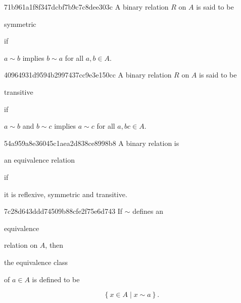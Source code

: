 \begin{note}{71b961a1f8f347dcbf7b9c7c8dee303c}
    A binary relation \({ R }\) on \({ A }\) is said to be \begin{icloze}{2}symmetric\end{icloze} if
    \begin{icloze}{1}
        \begin{center}
            \({ a \sim b }\) implies \({ b \sim a }\) for all \({ a, b \in A }\).
        \end{center}
    \end{icloze}
\end{note}

\begin{note}{40964931d9594b2997437cc9e3e150cc}
    A binary relation \({ R }\) on \({ A }\) is said to be \begin{icloze}{2}transitive\end{icloze} if
    \begin{icloze}{1}
        \begin{center}
            \({ a \sim b }\) and \({ b \sim c }\) implies \({ a \sim c }\) for all \({ a, b c \in A }\).
        \end{center}
    \end{icloze}
\end{note}

\begin{note}{54a959a8e36045c1aea2d838ce8998b8}
    A binary relation is \begin{icloze}{2}an equivalence relation\end{icloze} if \begin{icloze}{1}it is reflexive, symmetric and transitive.\end{icloze}
\end{note}

\begin{note}{7c28d643ddd74509b88cfe2f75e6d743}
    If \({ \sim }\) defines an \begin{icloze}{3}equivalence\end{icloze} relation on \({ A }\), then \begin{icloze}{2}the equivalence class\end{icloze} of \({ a \in A }\) is defined to be
    \begin{icloze}{1}
        \[
            \left\{ x \in A \mid x \sim a \right\}.
        \]
    \end{icloze}
\end{note}

